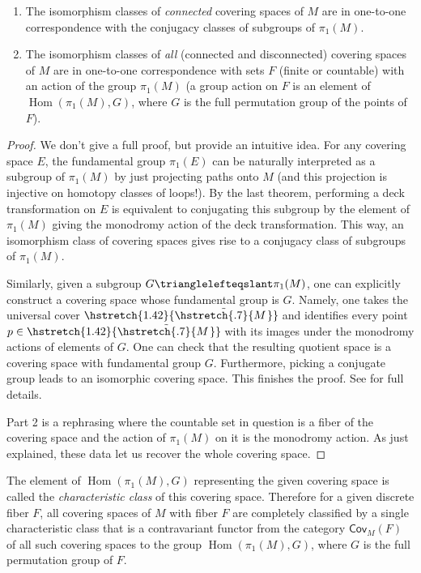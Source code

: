 \documentclass[english,letterpaper]{article}%
\numberwithin{equation}{section}
\numberwithin{figure}{section}
\numberwithin{table}{section}
\theoremstyle{definition}
\theoremstyle{definition}
\theoremstyle{definition}
\theoremstyle{plain}
\theoremstyle{plain}
\theoremstyle{plain}
\theoremstyle{plain}
\theoremstyle{remark}
\theoremstyle{remark}
\DeclareMathOperator{\Hom}{Hom}
\newcommand\wt[1]{\hstretch{1.42}{\tilde{\hstretch{.7}{#1\mkern2mu}}}\mkern-2mu}
\begin{document}
\begin{thm}
\begin{enumerate}
	\item The isomorphism classes of \emph{connected} covering spaces of $M$ are in one-to-one correspondence with the conjugacy classes of subgroups of $\pi_1(M)$. 
	\item The isomorphism classes of \emph{all} (connected and disconnected) covering spaces of $M$ are in one-to-one correspondence with sets $F$ (finite or countable) with an action of the group $\pi_1(M)$ (a group action on $F$ is an element of $\Hom(\pi_1(M),G)$, where $G$ is the full permutation group of the points of $F$).
\end{enumerate}
\end{thm}
\begin{proof}
We don't give a full proof, but provide an intuitive idea. For any covering space $E$, the fundamental group $\pi_1(E)$ can be naturally interpreted as a subgroup of $\pi_1(M)$ by just projecting paths onto $M$ (and this projection is injective on homotopy classes of loops!). By the last theorem, performing a deck transformation on $E$ is equivalent to conjugating this subgroup by the element of $\pi_1(M)$ giving the monodromy action of the deck transformation. This way, an isomorphism class of covering spaces gives rise to a conjugacy class of subgroups of $\pi_1(M)$.

Similarly, given a subgroup $G\trianglelefteqslant\pi_1(M)$, one can explicitly construct a covering space whose fundamental group is $G$. Namely, one takes the universal cover $\wt M$ and identifies every point $p\in\wt M$ with its images under the monodromy actions of elements of $G$. One can check that the resulting quotient space is a covering space with fundamental group $G$. Furthermore, picking a conjugate group leads to an isomorphic covering space. This finishes the proof. See \cite[Ch. 11]{LeeTop} for full details.

Part 2 is a rephrasing where the countable set in question is a fiber of the covering space and the action of $\pi_1(M)$ on it is the monodromy action. As just explained, these data let us recover the whole covering space.
\end{proof}

\begin{rem}
    The element of $\Hom(\pi_1(M),G)$ representing the given covering space is called the \emph{characteristic class} of this covering space. Therefore for a given discrete fiber $F$, all covering spaces of $M$ with fiber $F$ are completely classified by a single characteristic class that is a contravariant functor from the category $\mathsf{Cov}_M(F)$ of all such covering spaces to the group $\Hom(\pi_1(M),G)$, where $G$ is the full permutation group of $F$.
\end{rem}
\end{document}
